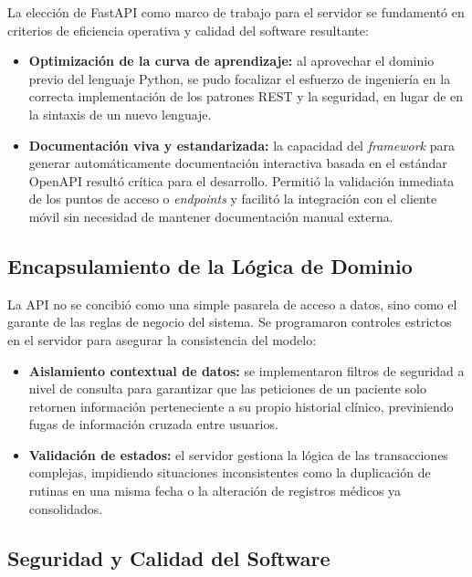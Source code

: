 La elección de FastAPI como marco de trabajo para el servidor se fundamentó en criterios de eficiencia operativa y calidad del software resultante:

\begin{itemize}
    \item \textbf{Optimización de la curva de aprendizaje:} al aprovechar el dominio previo del lenguaje Python, se pudo focalizar el esfuerzo de ingeniería en la correcta implementación de los patrones REST y la seguridad, en lugar de en la sintaxis de un nuevo lenguaje.
    \item \textbf{Documentación viva y estandarizada:} la capacidad del \textit{framework} para generar automáticamente documentación interactiva basada en el estándar OpenAPI resultó crítica para el desarrollo. Permitió la validación inmediata de los puntos de acceso o \textit{endpoints} y facilitó la integración con el cliente móvil sin necesidad de mantener documentación manual externa.
\end{itemize}

\subsection{Encapsulamiento de la Lógica de Dominio}

La API no se concibió como una simple pasarela de acceso a datos, sino como el garante de las reglas de negocio del sistema. Se programaron controles estrictos en el servidor para asegurar la consistencia del modelo:

\begin{itemize}
    \item \textbf{Aislamiento contextual de datos:} se implementaron filtros de seguridad a nivel de consulta para garantizar que las peticiones de un paciente solo retornen información perteneciente a su propio historial clínico, previniendo fugas de información cruzada entre usuarios.
    \item \textbf{Validación de estados:} el servidor gestiona la lógica de las transacciones complejas, impidiendo situaciones inconsistentes como la duplicación de rutinas en una misma fecha o la alteración de registros médicos ya consolidados.
\end{itemize}

\subsection{Seguridad y Calidad del Software}

